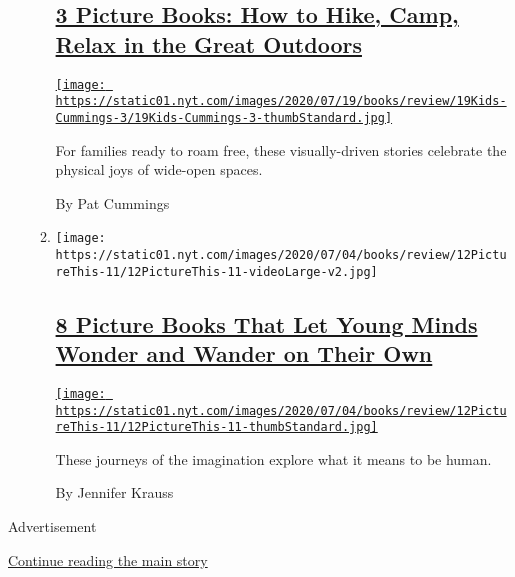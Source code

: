 \begin{enumerate}
\begin{enumerate}
    \hypertarget{3-picture-books-how-to-hike-camp-relax-in-the-great-outdoors}{%
    \subsection{\texorpdfstring{\href{/2020/07/11/books/picture-books-the-camping-trip-jennifer-k-mann.html}{3
    Picture Books: How to Hike, Camp, Relax in the Great
    Outdoors}}{3 Picture Books: How to Hike, Camp, Relax in the Great Outdoors}}\label{3-picture-books-how-to-hike-camp-relax-in-the-great-outdoors}}

    \href{/2020/07/11/books/picture-books-the-camping-trip-jennifer-k-mann.html}{\texttt{[image: https://static01.nyt.com/images/2020/07/19/books/review/19Kids-Cummings-3/19Kids-Cummings-3-thumbStandard.jpg]}}

    For families ready to roam free, these visually-driven stories
    celebrate the physical joys of wide-open spaces.

    By Pat Cummings
  \item
    \texttt{[image: https://static01.nyt.com/images/2020/07/04/books/review/12PictureThis-11/12PictureThis-11-videoLarge-v2.jpg]}

    \hypertarget{8-picture-books-that-let-young-minds-wonder-and-wander-on-their-own}{%
    \subsection{\texorpdfstring{\href{/2020/07/04/books/picture-books-miyakoshi-akiko-i-dream-of-a-journey.html}{8
    Picture Books That Let Young Minds Wonder and Wander on Their
    Own}}{8 Picture Books That Let Young Minds Wonder and Wander on Their Own}}\label{8-picture-books-that-let-young-minds-wonder-and-wander-on-their-own}}

    \href{/2020/07/04/books/picture-books-miyakoshi-akiko-i-dream-of-a-journey.html}{\texttt{[image: https://static01.nyt.com/images/2020/07/04/books/review/12PictureThis-11/12PictureThis-11-thumbStandard.jpg]}}

    These journeys of the imagination explore what it means to be human.

    By Jennifer Krauss
  \end{enumerate}
\end{enumerate}

Advertisement

\protect\hyperlink{after-mid1}{Continue reading the main story}

\subsection{\texorpdfstring{\protect\hyperlink{}{}}{}}

